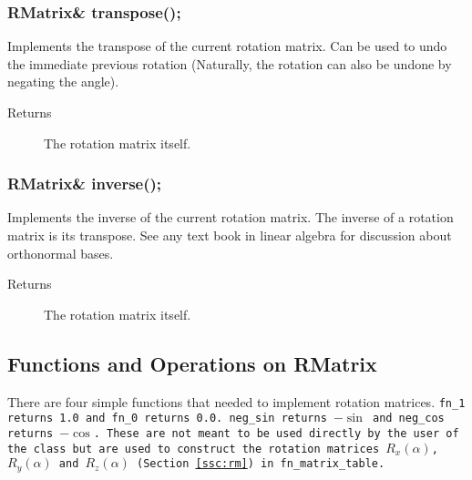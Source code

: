 \subsubsection{RMatrix\& transpose();}
Implements the transpose of the current rotation matrix. Can be used to undo
the immediate previous rotation (Naturally, the rotation can also be undone
by negating the angle).
     
    \begin{description}
       \item [Returns] The rotation matrix itself.
    \end{description} 

\subsubsection{RMatrix\& inverse();}
Implements the inverse of the current rotation matrix. The inverse
of a rotation matrix is its transpose. See any text book in linear algebra 
for discussion about orthonormal bases.

    \begin{description}
       \item [Returns] The rotation matrix itself.
    \end{description} 

\subsection{Functions and Operations on RMatrix}
There are four simple functions that needed to implement rotation
matrices. \tt fn\_1 \rm returns 1.0 and \tt fn\_0 \rm returns 0.0. 
\tt neg\_sin \rm returns $-\sin$ and \tt neg\_cos \rm returns $-\cos$. 
These are not meant to be used directly by the user of the class 
but are used to construct the rotation matrices 
$R_{x}(\alpha)$, $R_{y}(\alpha)$ and $R_{z}(\alpha)$ (Section 
\ref{ssc:rm}) in \tt fn\_matrix\_table\rm.
 
